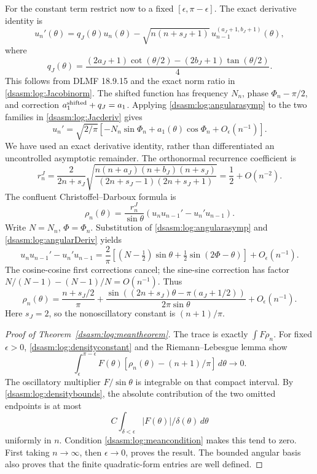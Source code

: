 \documentclass[11pt,letterpaper]{article}
\theoremstyle{remark}\newtheorem{remark}[theorem]{Remark}
\begin{document}
For the constant term restrict now to a fixed
$[\epsilon,\pi-\epsilon]$. The exact derivative identity is
\begin{equation}\label{dsasm:log:Jacderiv}
 u_n'(\theta)=q_J(\theta)u_n(\theta)
       -\sqrt{n(n+s_J+1)}\,u_{n-1}^{(a_J+1,b_J+1)}(\theta),
\end{equation}
where
\[
 q_J(\theta)=\frac{(2a_J+1)\cot(\theta/2)
                           -(2b_J+1)\tan(\theta/2)}4.
\]
This follows from DLMF 18.9.15 and the exact norm ratio in
\eqref{dsasm:log:Jacobinorm}. The shifted function has frequency $N_n$,
phase $\Phi_n-\pi/2$, and correction
$a_1^{\rm shifted}+q_J=a_1$. Applying \eqref{dsasm:log:angularasymp} to the
two families in \eqref{dsasm:log:Jacderiv} gives
\begin{equation}\label{dsasm:log:angularDeriv}
 u_n'=\sqrt{2/\pi}
       [-N_n\sin\Phi_n+a_1(\theta)\cos\Phi_n+O_\epsilon(n^{-1})].
\end{equation}
We have used an exact derivative identity, rather than differentiated
an uncontrolled asymptotic remainder.
The orthonormal recurrence coefficient is
\[
 r_n^J=\frac2{2n+s_J}
 \sqrt{\frac{n(n+a_J)(n+b_J)(n+s_J)}
 {(2n+s_J-1)(2n+s_J+1)}}=\frac12+O(n^{-2}).
\]
The confluent Christoffel--Darboux formula is
\[
 \rho_n(\theta)=\frac{r_n^J}{\sin\theta}
                    (u_nu_{n-1}'-u_n'u_{n-1}).
\]
Write $N=N_n$, $\Phi=\Phi_n$. Substitution of
\eqref{dsasm:log:angularasymp} and \eqref{dsasm:log:angularDeriv} yields
\[
 u_nu_{n-1}'-u_n'u_{n-1}
 =\frac2\pi\left[(N-\tfrac12)\sin\theta
                   +\tfrac12\sin(2\Phi-\theta)\right]
                   +O_\epsilon(n^{-1}).
\]
The cosine-cosine first corrections cancel; the sine-sine correction
has factor $N/(N-1)-(N-1)/N=O(n^{-1})$. Thus
\begin{equation}\label{dsasm:log:densityconstant}
 \rho_n(\theta)=\frac{n+s_J/2}{\pi}
 +\frac{\sin((2n+s_J)\theta-\pi(a_J+1/2))}{2\pi\sin\theta}
 +O_\epsilon(n^{-1}).
\end{equation}
Here $s_J=2$, so the nonoscillatory constant is $(n+1)/\pi$.

\begin{proof}[Proof of Theorem~\ref{dsasm:log:meantheorem}]
The trace is exactly $\int F\rho_n$. For fixed $\epsilon>0$,
\eqref{dsasm:log:densityconstant} and the Riemann--Lebesgue lemma show
\[
 \int_\epsilon^{\pi-\epsilon}F(\theta)
          [\rho_n(\theta)-(n+1)/\pi]\,d\theta\longrightarrow0.
\]
The oscillatory multiplier $F/\sin\theta$ is integrable on that
compact interval. By \eqref{dsasm:log:densitybounds}, the absolute contribution
of the two omitted endpoints is at most
\[
 C\int_{\delta<\epsilon}|F(\theta)|/\delta(\theta)\,d\theta
\]
uniformly in $n$. Condition \eqref{dsasm:log:meancondition} makes this tend
to zero. First taking $n\to\infty$, then $\epsilon\to0$, proves
the result. The bounded angular basis also proves that the finite
quadratic-form entries are well defined.
\end{proof}
\end{document}
